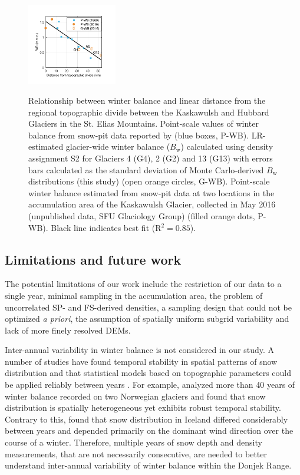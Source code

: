 \documentclass[twocolumn, letterpaper]{igs}
\begin{document}
\begin{figure}
	\centering
	\includegraphics[width =0.35\textwidth]{AccumGrad.pdf}\\
	\caption{Relationship between winter balance and linear distance from the regional topographic divide between the Kaskawulsh and Hubbard Glaciers in the St. Elias Mountains. Point-scale values of winter balance from snow-pit data reported by \cite{Taylor1969} (blue boxes, P-WB). LR-estimated glacier-wide winter balance ($B_\mathrm{w}$) calculated using density assignment S2 for Glaciers 4 (G4), 2 (G2) and 13 (G13) with errors bars calculated as the standard deviation of Monte Carlo-derived $B_\mathrm{w}$ distributions (this study) (open orange circles, G-WB). Point-scale winter balance estimated from snow-pit data at two locations in the accumulation area of the Kaskawulsh Glacier, collected in May 2016 (unpublished data, SFU Glaciology Group) (filled orange dots, P-WB). Black line indicates best fit (R$^2=0.85$).}
	\label{fig:AccumGrad}
\end{figure}

\subsection{Limitations and future work}

The potential limitations of our work include the restriction of our data to a single year, minimal sampling in the accumulation area, the problem of uncorrelated SP- and FS-derived densities, a sampling design that could not be optimized \textit{a priori}, the assumption of spatially uniform subgrid variability and lack of more finely resolved DEMs.

Inter-annual variability in winter balance is not considered in our study. A number of studies have found temporal stability in spatial patterns of snow distribution and that statistical models based on topographic parameters could be applied reliably between years \citep[e.g.][]{Grunewald2013}. For example, \cite{Walmsley2015} analyzed more than 40 years of winter balance recorded on two Norwegian glaciers and found that snow distribution is spatially heterogeneous yet exhibits robust temporal stability. Contrary to this, \cite{Crochet2007} found that snow distribution in Iceland differed considerably between years and depended primarily on the dominant wind direction over the course of a winter. Therefore, multiple years of snow depth and density measurements, that are not necessarily consecutive, are needed to better understand inter-annual variability of winter balance within the Donjek Range.
\end{document}
